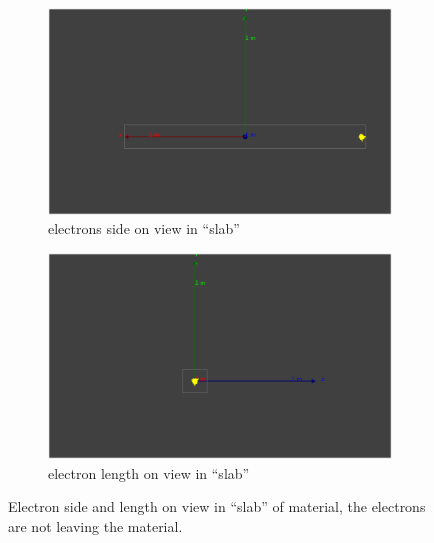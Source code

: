 \begin{figure}[H]
\centering
\begin{subfigure}{.5\textwidth}
  \centering
  \includegraphics[width=\linewidth]{e-_10MeV_Length_on_view.png}
  \captionsetup{width=.9\linewidth}
  \caption{electrons side on view in ``slab''}
  \label{subFig:electron_side_slab}
\end{subfigure}%
\begin{subfigure}{.5\textwidth}
  \centering
  \includegraphics[width=\linewidth]{e-_10MeV_side_on_view.png}
  \captionsetup{width=.9\linewidth}
  \caption{electron length on view in ``slab''}
  \label{subFig:electron_length_slab}
\end{subfigure}
\caption{Electron side and length on view in ``slab'' of material, the electrons are not leaving the material.}
\label{fig:electrons_viewed_in_slab}
\end{figure}


